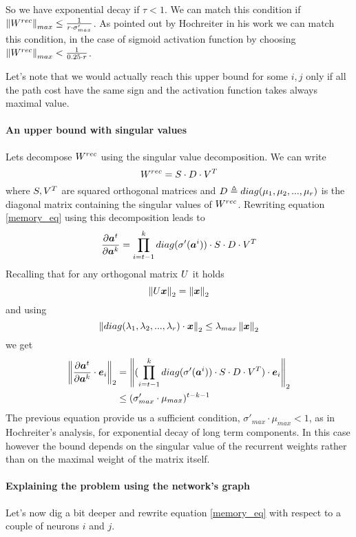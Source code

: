 So we have exponential decay if $\tau<1$. We can match this condition if $\left\Vert W^{rec} \right\Vert_{max} \leq \frac{1}{r\cdot \sigma'_{max}}$.
As pointed out by Hochreiter in his work we can match this condition, in the case of sigmoid activation function by choosing $\left\Vert W^{rec} \right\Vert_{max} < \frac{1}{0.25 \cdot r}$.

Let's note that we would actually reach this upper bound for some $i,j$ only if all the path cost have the same sign and the activation function takes always maximal
value.


\paragraph{An upper bound with singular values}
Lets decompose $W^{rec}$ using the singular value decomposition. We can write
\begin{equation}
 W^{rec} =  S\cdot D\cdot V^T
\end{equation}
where $S,V^T$ are squared orthogonal matrices and $D\triangleq diag(\mu_1, \mu_2,...,\mu_r)$ is the diagonal matrix containing the singular values of $W^{rec}$.
Rewriting equation \ref{memory_eq} using this decomposition leads to
\begin{equation}
\frac{\partial \boldsymbol{a}^t}{\partial \boldsymbol{a}^k} = \prod_{i=t-1}^{k}  diag(\sigma'(\boldsymbol{a}^i)) \cdot S\cdot D \cdot V^T
\label{memory_eq}
\end{equation}
Recalling that for any orthogonal matrix $U$ it holds $$\left\Vert U\boldsymbol{x} \right\Vert_2=\left\Vert \boldsymbol{x} \right\Vert_2$$  and using 
$$\left\Vert diag(\lambda_1, \lambda_2,...,\lambda_r)\cdot \boldsymbol{x} \right\Vert_2 \leq \lambda_{max} \left\Vert \boldsymbol{x} \right\Vert_2$$ we get
\begin{align}
\left\Vert \frac{\partial \boldsymbol{a}^t}{\partial \boldsymbol{a}^k} \cdot \boldsymbol{e}_i \right\Vert_2 &= \left\Vert  (\prod_{i=t-1}^{k} diag(\sigma'(\boldsymbol{a}^i)) \cdot S\cdot D \cdot V^T) \cdot \boldsymbol{e}_i \right\Vert_2\\
&\leq (\sigma'_{max} \cdot \mu_{max})^{t-k-1}
\end{align}
The previous equation provide us a sufficient condition, $\sigma'_{max} \cdot \mu_{max} <1 $, as in Hochreiter's analysis, for exponential decay of long term components. In this case however the bound depends on the singular value
of the recurrent weights rather than on the maximal weight of the matrix itself. 

\paragraph{Explaining the problem using the network's graph}
Let's now dig a bit deeper and rewrite equation \ref{memory_eq} with respect to a couple of neurons $i$ and $j$.

